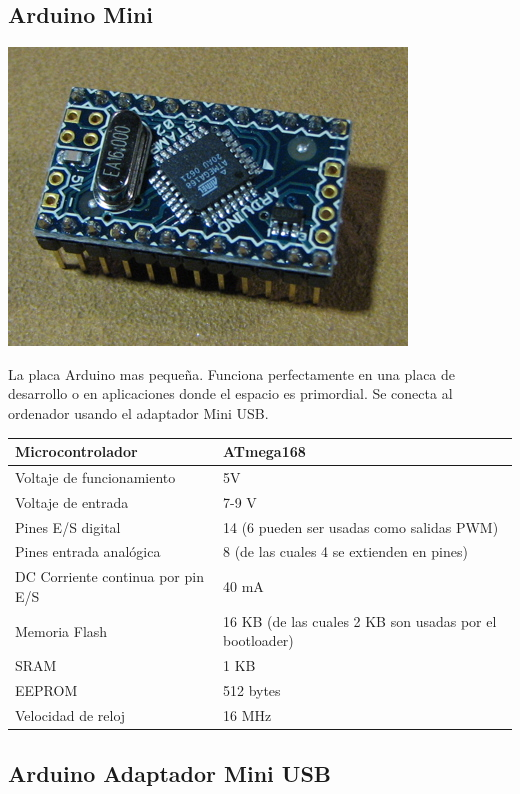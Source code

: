 \documentclass[12pt,a4paper]{report}
\begin{document}
\subsection{Arduino Mini}

\includegraphics[scale=0.6]{arduino_mini.jpg}

La placa Arduino mas pequeña. Funciona perfectamente en una placa de desarrollo o en aplicaciones donde el espacio es primordial. Se conecta al ordenador usando el adaptador Mini USB. 

\begin{tabular}{||l | l ||}
\hline
\hline
Microcontrolador & ATmega168\\
\hline
Voltaje de funcionamiento & 5V\\
\hline
Voltaje de entrada & 7-9 V\\
\hline
Pines E/S digital & 14 (6 pueden ser usadas como salidas PWM)\\
\hline
Pines entrada analógica & 8 (de las cuales 4 se extienden en pines)\\
\hline
DC Corriente continua por pin E/S & 40 mA\\
\hline
Memoria Flash & 16 KB (de las cuales 2 KB son usadas por el bootloader)\\
\hline
SRAM & 1 KB\\
\hline
EEPROM & 512 bytes\\
\hline
Velocidad de reloj & 16 MHz\\
\hline
\hline
\end{tabular}

\subsection{Arduino Adaptador Mini USB}
\end{document}
